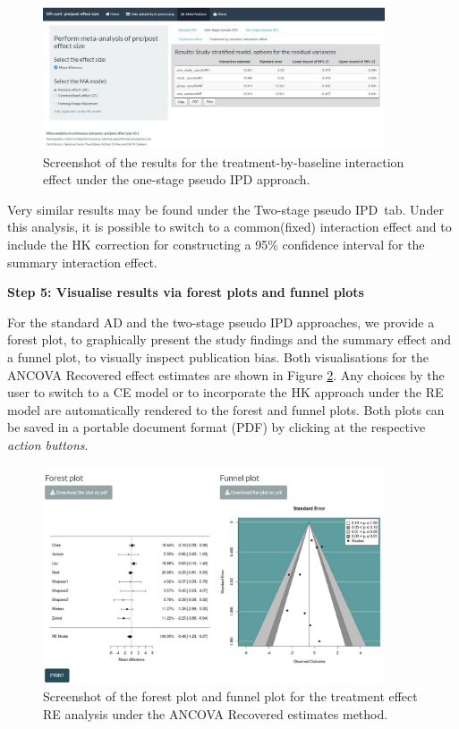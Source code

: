 \documentclass[AMA,STIX1COL]{WileyNJD-v2}
\begin{document}
\begin{figure} [t] 
  \centering \includegraphics[width=0.9\textwidth]{onestage_int.JPG}
    \caption{\small {Screenshot of the results for the treatment-by-baseline interaction effect under the one-stage pseudo IPD approach.}} \label{fig:shiny-one-int}
\end{figure}

Very similar results may be found under the \textquotesingle Two-stage pseudo IPD\textquotesingle\ tab. Under this analysis, it is possible to switch to a common(fixed) interaction effect and to include the HK correction for constructing a 95\% confidence interval for the summary interaction effect.

\newpage
\vspace{0.1cm}
\textbf{Step 5: Visualise results via forest plots and funnel plots}
\vspace{0.1cm}

For the standard AD and the two-stage pseudo IPD approaches, we provide a forest plot, to graphically present the study findings and the summary effect and a funnel plot, to visually inspect publication bias. Both visualisations for the ANCOVA Recovered effect estimates are shown in Figure \ref{fig:shiny-forest_funnel}. Any choices by the user to switch to a CE model or to incorporate the HK approach under the RE model are automatically rendered to the forest and funnel plots. Both plots can be saved in a portable document format (PDF) by clicking at the respective \textit{action buttons}.

\begin{figure} [t]
  \centering \includegraphics[width=0.9\textwidth]{forest_funnel.JPG}
    \caption{\small {Screenshot of the forest plot and funnel plot for the treatment effect RE analysis under the ANCOVA Recovered estimates method.}} \label{fig:shiny-forest_funnel}
\end{figure}
\end{document}
